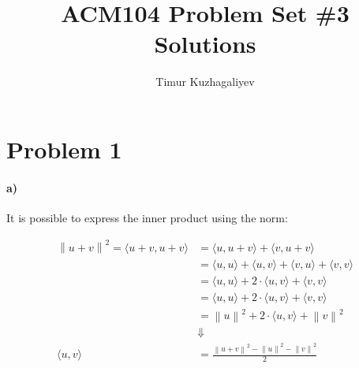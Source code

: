 \documentclass[10pt,letter]{article}
\newcommand{\inr}[2]{\langle #1, #2\rangle}
\newcommand\norm[1]{\left\lVert#1\right\rVert}
\begin{document}
\title{ACM104 Problem Set \#3 Solutions}

\author{Timur Kuzhagaliyev}

 
\maketitle 

\section*{Problem 1}

\paragraph{a)} It is possible to express the inner product using the norm:

\begin{align*}
\norm{u+v}^2 = \inr{u+v}{u+v} &= \inr{u}{u+v} + \inr{v}{u+v}
\\ & = \inr{u}{u} + \inr{u}{v} + \inr{v}{u} + \inr{v}{v}
\\ & = \inr{u}{u} + 2\cdot\inr{u}{v} + \inr{v}{v}
\\ & = \inr{u}{u} + 2\cdot\inr{u}{v} + \inr{v}{v}
\\ & = \norm{u}^2 + 2\cdot\inr{u}{v} + \norm{v}^2
\\ &\Downarrow
\\ \inr{u}{v} & = \frac{\norm{u+v}^2 - \norm{u}^2 - \norm{v}^2}{2}
\end{align*}
\end{document}
